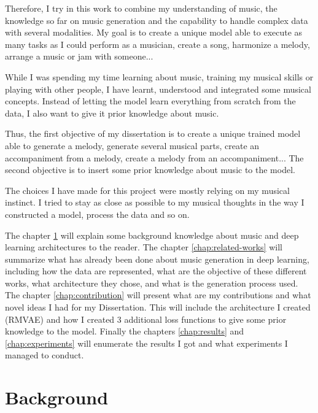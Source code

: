 \documentclass[12pt]{report}
\begin{document}
Therefore, I try in this work to combine my understanding of music, the knowledge so far on music generation and the capability to handle complex data with several modalities.
My goal is to create a unique model able to execute as many tasks as I could perform as a musician, create a song, harmonize a melody, arrange a music or jam with someone...

While I was spending my time learning about music, training my musical skills or playing with other people, I have learnt, understood and integrated some musical concepts.
Instead of letting the model learn everything from scratch from the data, I also want to give it prior knowledge about music.

Thus, the first objective of my dissertation is to create a unique trained model able to generate a melody, generate several musical parts, create an accompaniment from a melody, create a melody from an accompaniment...
The second objective is to insert some prior knowledge about music to the model.

The choices I have made for this project were mostly relying on my musical instinct.
I tried to stay as close as possible to my musical thoughts in the way I constructed a model, process the data and so on.

The chapter \ref{chap:background} will explain some background knowledge about music and deep learning architectures to the reader.
The chapter \ref{chap:related-works} will summarize what has already been done about music generation in deep learning, including how the data are represented, what are the objective of these different works, what architecture they chose, and what is the generation process used.
The chapter \ref{chap:contribution} will present what are my contributions and what novel ideas I had for my Dissertation.
This will include the architecture I created (RMVAE) and how I created 3 additional loss functions to give some prior knowledge to the model.
Finally the chapters \ref{chap:results} and \ref{chap:experiments} will enumerate the results I got and what experiments I managed to conduct.


\chapter{Background}
\label{chap:background}
\end{document}
